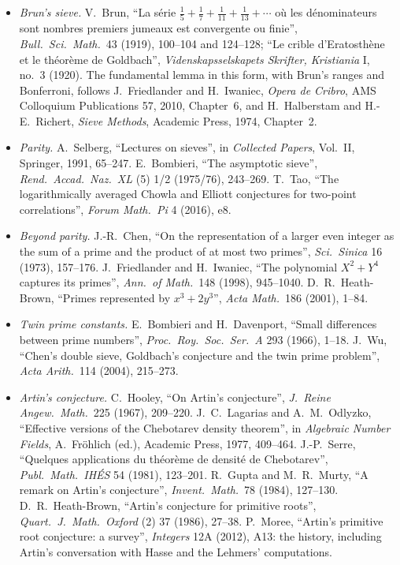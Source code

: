 \begin{itemize}
\item \emph{Brun's sieve.} V.~Brun, ``La s\'erie $\frac15+\frac17+\frac1{11}+\frac1{13}+\cdots$ o\`u les d\'enominateurs sont nombres premiers jumeaux est convergente ou finie'', \emph{Bull.\ Sci.\ Math.}\ 43 (1919), 100--104 and 124--128; ``Le crible d'Eratosthène et le théorème de Goldbach'', \emph{Videnskapsselskapets Skrifter, Kristiania} I, no.~3 (1920). The fundamental lemma in this form, with Brun's ranges and Bonferroni, follows J.~Friedlander and H.~Iwaniec, \emph{Opera de Cribro}, AMS Colloquium Publications 57, 2010, Chapter~6, and H.~Halberstam and H.-E.~Richert, \emph{Sieve Methods}, Academic Press, 1974, Chapter~2.
\item \emph{Parity.} A.~Selberg, ``Lectures on sieves'', in \emph{Collected Papers}, Vol.~II, Springer, 1991, 65--247. E.~Bombieri, ``The asymptotic sieve'', \emph{Rend.\ Accad.\ Naz.\ XL} (5) 1/2 (1975/76), 243--269. T.~Tao, ``The logarithmically averaged Chowla and Elliott conjectures for two-point correlations'', \emph{Forum Math.\ Pi} 4 (2016), e8.
\item \emph{Beyond parity.} J.-R.~Chen, ``On the representation of a larger even integer as the sum of a prime and the product of at most two primes'', \emph{Sci.\ Sinica} 16 (1973), 157--176. J.~Friedlander and H.~Iwaniec, ``The polynomial $X^2+Y^4$ captures its primes'', \emph{Ann.\ of Math.}\ 148 (1998), 945--1040. D.~R.~Heath-Brown, ``Primes represented by $x^3+2y^3$'', \emph{Acta Math.}\ 186 (2001), 1--84.
\item \emph{Twin prime constants.} E.~Bombieri and H.~Davenport, ``Small differences between prime numbers'', \emph{Proc.\ Roy.\ Soc.\ Ser.\ A} 293 (1966), 1--18. J.~Wu, ``Chen's double sieve, Goldbach's conjecture and the twin prime problem'', \emph{Acta Arith.}\ 114 (2004), 215--273.
\item \emph{Artin's conjecture.} C.~Hooley, ``On Artin's conjecture'', \emph{J.\ Reine Angew.\ Math.}\ 225 (1967), 209--220. J.~C.~Lagarias and A.~M.~Odlyzko, ``Effective versions of the Chebotarev density theorem'', in \emph{Algebraic Number Fields}, A.~Fröhlich (ed.), Academic Press, 1977, 409--464. J.-P.~Serre, ``Quelques applications du th\'eor\`eme de densit\'e de Chebotarev'', \emph{Publ.\ Math.\ IH\'ES} 54 (1981), 123--201. R.~Gupta and M.~R.~Murty, ``A remark on Artin's conjecture'', \emph{Invent.\ Math.}\ 78 (1984), 127--130. D.~R.~Heath-Brown, ``Artin's conjecture for primitive roots'', \emph{Quart.\ J.\ Math.\ Oxford} (2) 37 (1986), 27--38. P.~Moree, ``Artin's primitive root conjecture: a survey'', \emph{Integers} 12A (2012), A13: the history, including Artin's conversation with Hasse and the Lehmers' computations.
\end{itemize}
